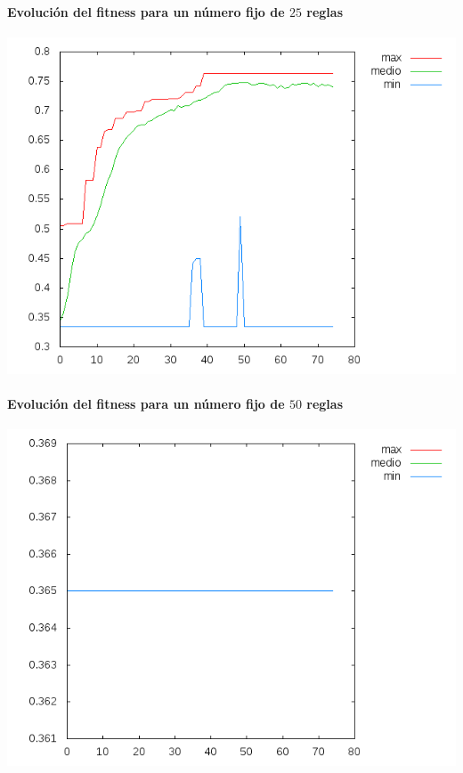 \documentclass[nochap]{apuntes}
\begin{document}
\paragraph{Evolución del fitness para un número fijo de $25$ reglas}
\begin{center}
\includegraphics[scale=0.5]{tex/img/g75_p75_MejoresPorPeores_SeleccionProporcionalAlFitness_reg25.png}
\end{center}
\paragraph{Evolución del fitness para un número fijo de $50$ reglas}
\begin{center}
\includegraphics[scale=0.5]{tex/img/g75_p75_MejoresPorPeores_SeleccionProporcionalAlFitness_reg50.png}
\end{center}
\end{document}
